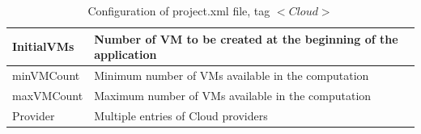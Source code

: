 \begin{table}[h]
  \begin{center}
    \begin{tabular}{| p{} | p{} |}
      \hline
      InitialVMs	&	Number of VM to be created at the beginning of the application	\\
      \hline
      minVMCount	&	Minimum number of VMs available in the computation	\\
      \hline
      maxVMCount	&	Maximum number of VMs available in the computation	\\
      \hline
      Provider 	&	Multiple entries of Cloud providers	\\
      \hline
    \end{tabular}
    \caption{Configuration of project.xml file, tag $<Cloud>$}
    \label{tab:conf_project_xml_cloud}
  \end{center}
\end{table}

\newpage

